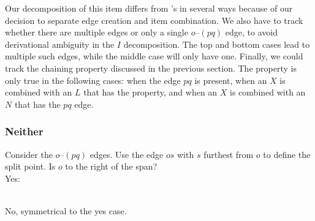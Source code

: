 Our decomposition of this item differs from \textcite{ec}'s in several ways because of our decision to separate edge creation and item combination.
We also have to track whether there are multiple edges or only a single $o$--$(pq)$ edge, to avoid derivational ambiguity in the $I$ decomposition.
The top and bottom cases lead to multiple such edges, while the middle case will only have one.
Finally, we could track the chaining property discussed in the previous section.
The property is only true in the following cases: when the edge $pq$ is present, when an $X$ is combined with an $L$ that has the property, and when an $X$ is combined with an $N$ that has the $pq$ edge.

\subsubsection{Neither}
Consider the $o$--$(pq)$ edges.
Use the edge $os$ with $s$ furthest from $o$ to define the split point.
Is $o$ to the right of the span? \\
Yes: \\
\begin{tightflushright}
\end{tightflushright} \\
No, symmetrical to the yes case.

